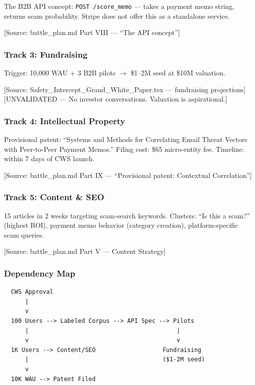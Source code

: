 \documentclass[11pt, letterpaper]{article}
\newcommand{\source}[1]{\textcolor{citation}{[Source: #1]}}
\newcommand{\unvalidated}[1]{\textcolor{unvalidated}{[UNVALIDATED --- #1]}}
\begin{document}
  The B2B API concept: \texttt{POST /score\_memo} --- takes a payment memo string, returns scam probability. Stripe does not offer this as a standalone service.

  \source{battle\_plan.md Part VIII --- ``The API concept''}

  \subsubsection{Track 3: Fundraising}

  Trigger: 10,000 WAU + 3 B2B pilots $\rightarrow$ \$1--2M seed at \$10M valuation.

  \source{Safety\_Intercept\_Grand\_White\_Paper.tex --- fundraising projections}\\
  \unvalidated{No investor conversations. Valuation is aspirational.}

  \subsubsection{Track 4: Intellectual Property}

  Provisional patent: ``Systems and Methods for Correlating Email Threat Vectors with Peer-to-Peer Payment Memos.'' Filing cost: \$65 micro-entity fee. Timeline: within 7 days of CWS launch.

  \source{battle\_plan.md Part IX --- ``Provisional patent: Contextual Correlation''}

  \subsubsection{Track 5: Content \& SEO}

  15 articles in 2 weeks targeting scam-search keywords. Clusters: ``Is this a scam?'' (highest ROI), payment memo behavior (category creation), platform-specific scam queries.

  \source{battle\_plan.md Part V --- Content Strategy}

  \subsubsection{Dependency Map}

  \begin{verbatim}
  CWS Approval
      |
      v
  100 Users --> Labeled Corpus --> API Spec --> Pilots
      |                                          |
      v                                          v
  1K Users --> Content/SEO                   Fundraising
      |                                      ($1-2M seed)
      v
  10K WAU --> Patent Filed
  \end{verbatim}
\end{document}
